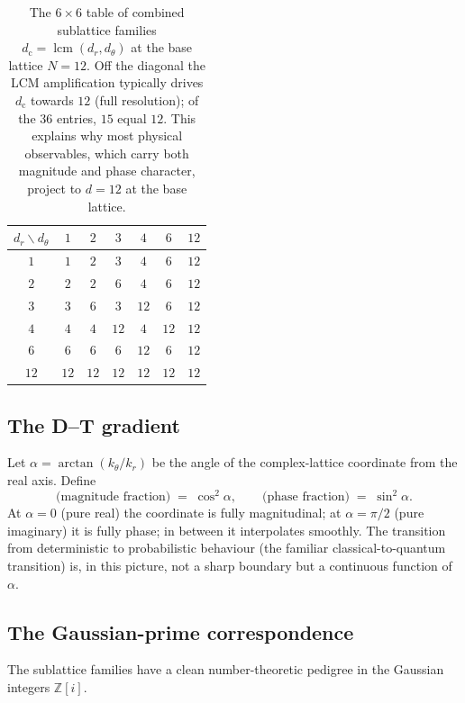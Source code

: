 \documentclass[11pt,a4paper]{article}
\theoremstyle{definition}
\theoremstyle{remark}
\newcommand{\Z}{\mathbb{Z}}
\DeclareMathOperator{\lcm}{lcm}
\begin{document}
\begin{table}[h]
\centering
\begin{tabular}{@{}c c c c c c c@{}}
\toprule
$d_{r}\backslash d_{\theta}$ & $1$ & $2$ & $3$ & $4$ & $6$ & $12$\\
\midrule
$1$ & $1$ & $2$ & $3$ & $4$ & $6$ & $12$\\
$2$ & $2$ & $2$ & $6$ & $4$ & $6$ & $12$\\
$3$ & $3$ & $6$ & $3$ & $12$ & $6$ & $12$\\
$4$ & $4$ & $4$ & $12$ & $4$ & $12$ & $12$\\
$6$ & $6$ & $6$ & $6$ & $12$ & $6$ & $12$\\
$12$ & $12$ & $12$ & $12$ & $12$ & $12$ & $12$\\
\bottomrule
\end{tabular}
\caption{The $6\times 6$ table of combined sublattice families $d_{\mathrm{c}}=\lcm(d_{r},d_{\theta})$ at the base lattice $N=12$. Off the diagonal the LCM amplification typically drives $d_{\mathrm{c}}$ towards $12$ (full resolution); of the $36$ entries, $15$ equal $12$. This explains why most physical observables, which carry both magnitude and phase character, project to $d=12$ at the base lattice.}
\label{tab:complex12}
\end{table}

\subsection{The D--T gradient}

Let $\alpha = \arctan(k_{\theta}/k_{r})$ be the angle of the complex-lattice coordinate from the real axis. Define
\[
\text{(magnitude fraction)} \;=\; \cos^{2}\alpha, \qquad \text{(phase fraction)} \;=\; \sin^{2}\alpha.
\]
At $\alpha=0$ (pure real) the coordinate is fully magnitudinal; at $\alpha=\pi/2$ (pure imaginary) it is fully phase; in between it interpolates smoothly. The transition from deterministic to probabilistic behaviour (the familiar classical-to-quantum transition) is, in this picture, not a sharp boundary but a continuous function of $\alpha$.

\subsection{The Gaussian-prime correspondence}

The sublattice families have a clean number-theoretic pedigree in the Gaussian integers $\Z[i]$.
\end{document}
